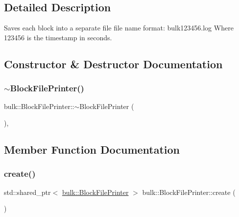 \subsection{Detailed Description}
Saves each block into a separate file file name format\+: bulk123456.\+log Where 123456 is the timestamp in seconds. 

\subsection{Constructor \& Destructor Documentation}
\mbox{\label{classbulk_1_1BlockFilePrinter_af93de98e11a9c3881ab6bbc7ab90de61}} 
\subsubsection{\texorpdfstring{$\sim$\+Block\+File\+Printer()}{~BlockFilePrinter()}}
{\footnotesize\ttfamily bulk\+::\+Block\+File\+Printer\+::$\sim$\+Block\+File\+Printer (\begin{DoxyParamCaption}{ }\end{DoxyParamCaption})\hspace{0.3cm}{\ttfamily [override]}, {\ttfamily [default]}}



\subsection{Member Function Documentation}
\mbox{\label{classbulk_1_1BlockFilePrinter_a595744d305a5ffedce26f5a1a764142b}} 
\subsubsection{\texorpdfstring{create()}{create()}}
{\footnotesize\ttfamily std\+::shared\+\_\+ptr$<$ \hyperlink{classbulk_1_1BlockFilePrinter}{bulk\+::\+Block\+File\+Printer} $>$ bulk\+::\+Block\+File\+Printer\+::create (\begin{DoxyParamCaption}{ }\end{DoxyParamCaption})\hspace{0.3cm}{\ttfamily [static]}}

